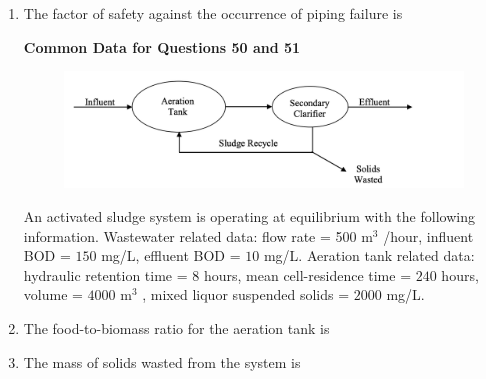 \documentclass[journal]{IEEEtran}
\begin{document}
\begin{enumerate}
\item The factor of safety against the occurrence of piping failure is \hfill {}
\begin{enumerate}
\end{enumerate}


\textbf{Common Data for Questions 50 and 51}

\begin{figure}[H]
    \centering
    \includegraphics[width=0.3\columnwidth]{figs/Q50.png} 
    \caption{}
    \label{fig:placeholder}
\end{figure}

An activated sludge system  is operating at equilibrium with the following information. Wastewater related data: flow rate = 500 m$^{3}$ /hour, influent BOD = $150$ mg/L, effluent BOD = $10$ mg/L. Aeration tank related data: hydraulic retention time = $8$ hours, mean cell-residence time = $240$ hours, volume = $4000$ m$^{3}$ , mixed liquor suspended solids = $2000$ mg/L. 

\item The food-to-biomass  ratio  for the aeration tank is \hfill {}
\begin{enumerate}
\end{enumerate}

\item The mass  of solids wasted from the system is \hfill {}
\begin{enumerate}
\end{enumerate}


\end{enumerate}
\end{document}
